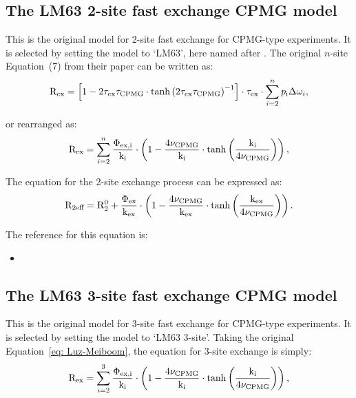 
\subsection{The LM63 2-site fast exchange CPMG model}
\label{sect: dispersion: LM63 model}

This is the original model for 2-site fast exchange for CPMG-type experiments.
It is selected by setting the model to `LM63', here named after \citet{LuzMeiboom63}.
The original $n$-site Equation~(7) from their paper can be written as:
\begin{equation}
    \mathrm{R}_\textrm{ex} = \left[ 1 - 2\tau_\textrm{ex}\tau_\textrm{CPMG} \cdot \tanh \left( 2\tau_\textrm{ex}\tau_\textrm{CPMG} \right)^{-1} \right] \cdot \tau_\textrm{ex} \cdot \sum_{i=2}^n p_\textrm{i}\Delta\omega_{i} ,
\end{equation}

or rearranged as:
\begin{equation} \label{eq: Luz-Meiboom}
    \mathrm{R}_\textrm{ex} = \sum_{i=2}^n \frac{\Phi_\textrm{ex,i}}{\textrm{k}_\textrm{i}} \cdot \left( 1 - \frac{4\nu_\textrm{CPMG}}{\textrm{k}_\textrm{i}} \cdot \tanh \left( \frac{\textrm{k}_\textrm{i}}{4\nu_\textrm{CPMG}} \right) \right) ,
\end{equation}


The equation for the 2-site exchange process can be expressed as:
\begin{equation}
    \mathrm{R}_{2\textrm{eff}} = \mathrm{R}_2^0 + \frac{\Phi_\textrm{ex}}{\textrm{k}_\textrm{ex}} \cdot \left( 1 - \frac{4\nu_\textrm{CPMG}}{\textrm{k}_\textrm{ex}} \cdot \tanh \left( \frac{\textrm{k}_\textrm{ex}}{4\nu_\textrm{CPMG}} \right) \right) .
\end{equation}

The reference for this equation is:
\begin{itemize}
\item {}
\end{itemize}



\subsection{The LM63 3-site fast exchange CPMG model}
\label{sect: dispersion: LM63 3-site model}

This is the original \citet{LuzMeiboom63} model for 3-site fast exchange for CPMG-type experiments.
It is selected by setting the model to `LM63 3-site'.
Taking the original Equation~\ref{eq: Luz-Meiboom}, the equation for 3-site exchange is simply:
\begin{equation}
    \mathrm{R}_\textrm{ex} = \sum_{i=2}^3 \frac{\Phi_\textrm{ex,i}}{\textrm{k}_\textrm{i}} \cdot \left( 1 - \frac{4\nu_\textrm{CPMG}}{\textrm{k}_\textrm{i}} \cdot \tanh \left( \frac{\textrm{k}_\textrm{i}}{4\nu_\textrm{CPMG}} \right) \right) ,
\end{equation}

